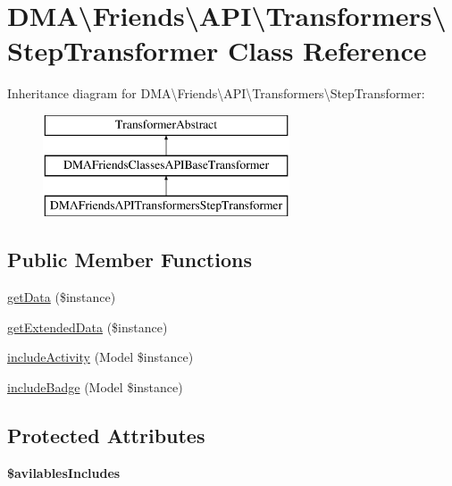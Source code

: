 \hypertarget{classDMA_1_1Friends_1_1API_1_1Transformers_1_1StepTransformer}{}\section{D\+M\+A\textbackslash{}Friends\textbackslash{}A\+P\+I\textbackslash{}Transformers\textbackslash{}Step\+Transformer Class Reference}
\label{classDMA_1_1Friends_1_1API_1_1Transformers_1_1StepTransformer}
Inheritance diagram for D\+M\+A\textbackslash{}Friends\textbackslash{}A\+P\+I\textbackslash{}Transformers\textbackslash{}Step\+Transformer\+:\begin{figure}[H]
\begin{center}
\leavevmode
\includegraphics[height=3.000000cm]{de/d3c/classDMA_1_1Friends_1_1API_1_1Transformers_1_1StepTransformer}
\end{center}
\end{figure}
\subsection*{Public Member Functions}
\begin{DoxyCompactItemize}
\item 
\hyperlink{classDMA_1_1Friends_1_1API_1_1Transformers_1_1StepTransformer_af598033e757246e05cb07b0e9256ef20}{get\+Data} (\$instance)
\item 
\hyperlink{classDMA_1_1Friends_1_1API_1_1Transformers_1_1StepTransformer_aa09dd3be3937396f320a2d7827537818}{get\+Extended\+Data} (\$instance)
\item 
\hyperlink{classDMA_1_1Friends_1_1API_1_1Transformers_1_1StepTransformer_a8052fad1a0585b225720e12f619e01cf}{include\+Activity} (Model \$instance)
\item 
\hyperlink{classDMA_1_1Friends_1_1API_1_1Transformers_1_1StepTransformer_a5658c6eb2bff831cd21c37037b3b4978}{include\+Badge} (Model \$instance)
\end{DoxyCompactItemize}
\subsection*{Protected Attributes}
\begin{DoxyCompactItemize}
\item 
{\bfseries \$avilables\+Includes}
\end{DoxyCompactItemize}


